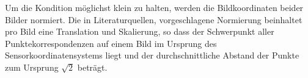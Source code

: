 
Um die Kondition möglichst klein zu halten, werden die Bildkoordinaten beider Bilder normiert.
Die in Literaturquellen, vorgeschlagene Normierung beinhaltet pro Bild eine Translation und Skalierung, so dass der Schwerpunkt aller Punktekorrespondenzen auf einem Bild im Ursprung des Sensorkoordinatensystems liegt und der durchschnittliche Abstand der Punkte zum Ursprung $\sqrt{2}$ beträgt\cite{HZ,Ferid,Brooks}.\\

%
%
%
%
%
%
%
